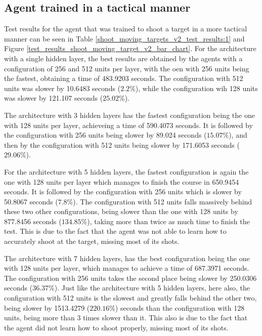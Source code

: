 \subsection{Agent trained in a tactical manner} \label{shoot_moving_target_tactical_subsection}

Test results for the agent that was trained to shoot a target in a more tactical manner can be seen in Table \ref{shoot_moving_targets_v2_test_results:1} and Figure \ref{test_results_shoot_moving_target_v2_bar_chart}. For the architecture with a single hidden layer, the best results are obtained by the agents with a  configuration of 256 and 512 units per layer, with the oen with 256 units being the fastest, obtaining a time of 483.9203 seconds. The configuration with 512 units was slower by 10.6483 seconds ($2.2\%$), while the configuration wih 128 units was slower by 121.107 seconds ($25.02\%$).

The architecture with 3 hidden layers has the fastest configuration being the one with 128 units per layer, achieveing a time of 590.4073 seconds. It is followed by the configuration with 256 units being slower by 89.024 seconds ($15.07\%$), and then by the configuration with 512 units being slower by 171.6053 seconds ($29.06\%$).

For the architecture with 5 hidden layers, the fastest configuration is again the one with 128 units per layer which manages to finish the course in 650.9454 seconds. It is followed by the configuration with 256 units which is slower by 50.8067 seconds ($7.8\%$). The configuration with 512 units falls massively behind these two other configurations, being slower than the one with 128 units by 877.8456 seconds ($134.85\%$), taking more than twice as much time to finish the test. This is due to the fact that the agent was not able to learn how to accurately shoot at the target, missing most of its shots.

The architecture with 7 hidden layers, has the best configuration being the one with 128 units per layer, which manages to achieve a time of 687.3971 seconds. The configuration with 256 units takes the second place being slower by 250.0306 seconds ($36.37\%$). Just like the architecture with 5 hidden layers, here also, the configuration with 512 units is the slowest and greatly falls behind the other two, being slower by 1513.4279 ($220.16\%$) seconds than the configuration with 128 units, being more than 3 times slower than it. This also is due to the fact that the agent did not learn how to shoot properly, missing most of its shots.

